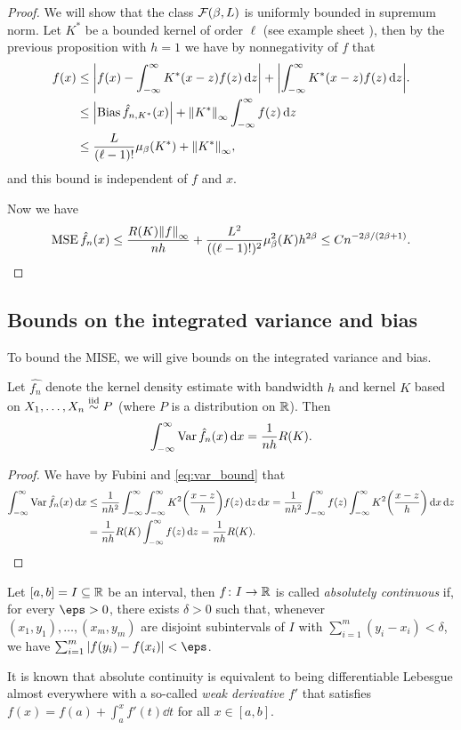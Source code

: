 \begin{proof}
	We will show that the class $\mathcal F(\beta, L)$ is uniformly bounded in supremum norm. Let $K^*$ be a bounded kernel of order $\ell$ (see example sheet \TODO), then by the previous proposition with $h = 1$ we have by nonnegativity of $f$ that
	\begin{align*}
		f(x) &\leq \abs{f(x)- \int_{-\infty}^\infty K^*(x - z) f(z) \dd{z}} + \abs{\int_{-\infty}^\infty K^*(x-z) f(z) \dd{z}}.	\\
		&\leq \abs{\operatorname{Bias} \hat f_{n, K^*}(x)} + \norm{K^*}_\infty \int_{-\infty}^\infty  f(z) \dd{z} \\
		&\leq \frac{L}{(\ell - 1)!} \mu_\beta(K^*) + \norm{K^*}_\infty,
	\end{align*}
and this bound is independent of $f$ and $x$.

Now we have
\[
\operatorname{MSE} \hat f_n(x) \leq \frac{R(K) \norm{f}_\infty}{nh} + \frac{L^2}{((\ell - 1)!)^2} \mu^2_\beta(K) h^{2\beta} \leq C n^{-2\beta/(2\beta + 1)}. 
\]
\end{proof}


\subsection{Bounds on the integrated variance and bias}
To bound the MISE, we will give bounds on the integrated variance and bias. 
\begin{proposition}
	Let $\hat{f_n}$ denote the kernel density estimate with bandwidth $h$ and kernel $K$ based on $X_1, \dotsc, X_n \overset{\mathrm{iid}}{\sim} P$ (where $P$ is a distribution on $\mathbb R$). Then
	\[
	\int_{-\infty}^\infty \operatorname{Var} \hat f_n(x) \dd{x} = \frac1{nh} R(K). 
	\]
\end{proposition} 

\begin{proof}
	We have by Fubini and \cref{eq:var_bound} that
	\begin{align*}
		\int_{-\infty}^\infty \operatorname{Var}\hat f_n(x) \dd{x} &\leq \frac1{nh^2} \int_{-\infty}^\infty \int_{-\infty}^\infty K^2\qty(\frac{x - z}{h}) f(z) \dd{z} \dd{x} = \frac1{nh^2} \int_{-\infty}^\infty f(z) \int_{-\infty}^\infty K^2\qty(\frac{x-z}{h}) \dd{x} \dd{z} \\
		&= \frac1{nh} R(K) \int_{-\infty}^\infty f(z) \dd{z} = \frac1{nh} R(K). 
	\end{align*}
\end{proof}

\begin{recap}
	Let $[a, b] = I \subseteq \mathbb R$ be an interval, then $f \colon I \to \mathbb R$ is called \emph{absolutely continuous} if, for every $\eps > 0$, there exists $\delta > 0$ such that, whenever $(x_1, y_1), \dotsc, (x_m, y_m)$ are disjoint subintervals of $I$ with $\sum_{i=1}^m (y_i - x_i) < \delta$, we have $\sum_{i=1}^m \abs{f(y_i) - f(x_i)} < \eps$. 
	
	It is known that absolute continuity is equivalent to being differentiable Lebesgue almost everywhere with a so-called \emph{weak derivative} $f'$ that satisfies $f(x) = f(a) + \int_a^x f'(t) \dd{t}$ for all $x \in [a, b]$. 
\end{recap}

